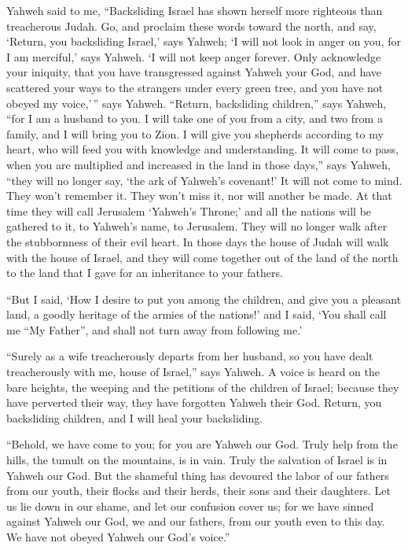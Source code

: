  Yahweh said to me, ``Backsliding Israel has shown
herself more righteous than treacherous Judah.  Go, and
proclaim these words toward the north, and say, `Return, you backsliding
Israel,' says Yahweh; `I will not look in anger on you, for I am
merciful,' says Yahweh. `I will not keep anger forever. 
Only acknowledge your iniquity, that you have transgressed against
Yahweh your God, and have scattered your ways to the strangers under
every green tree, and you have not obeyed my voice,'\,'' says Yahweh.
 ``Return, backsliding children,'' says Yahweh, ``for I
am a husband to you. I will take one of you from a city, and two from a
family, and I will bring you to Zion.  I will give you
shepherds according to my heart, who will feed you with knowledge and
understanding.  It will come to pass, when you are
multiplied and increased in the land in those days,'' says Yahweh,
``they will no longer say, `the ark of Yahweh's covenant!' It will not
come to mind. They won't remember it. They won't miss it, nor will
another be made.  At that time they will call Jerusalem
`Yahweh's Throne;' and all the nations will be gathered to it, to
Yahweh's name, to Jerusalem. They will no longer walk after the
stubbornness of their evil heart.  In those days the
house of Judah will walk with the house of Israel, and they will come
together out of the land of the north to the land that I gave for an
inheritance to your fathers.

 ``But I said, `How I desire to put you among the
children, and give you a pleasant land, a goodly heritage of the armies
of the nations!' and I said, `You shall call me ``My Father'', and shall
not turn away from following me.'

 ``Surely as a wife treacherously departs from her
husband, so you have dealt treacherously with me, house of Israel,''
says Yahweh.  A voice is heard on the bare heights, the
weeping and the petitions of the children of Israel; because they have
perverted their way, they have forgotten Yahweh their God.
 Return, you backsliding children, and I will heal your
backsliding.

``Behold, we have come to you; for you are Yahweh our God.
 Truly help from the hills, the tumult on the mountains,
is in vain. Truly the salvation of Israel is in Yahweh our God.
 But the shameful thing has devoured the labor of our
fathers from our youth, their flocks and their herds, their sons and
their daughters.  Let us lie down in our shame, and let
our confusion cover us; for we have sinned against Yahweh our God, we
and our fathers, from our youth even to this day. We have not obeyed
Yahweh our God's voice.''

